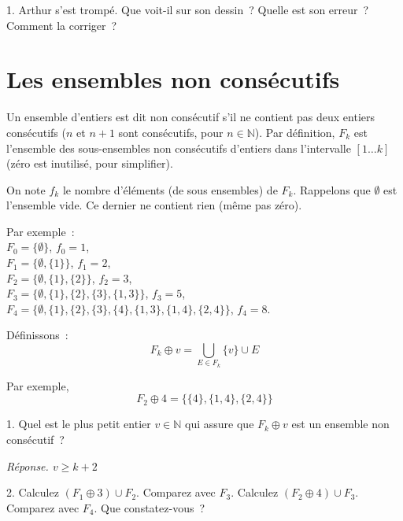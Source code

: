 \documentclass[11pt]{article}
\def\N{\mathbb N}
\newcommand{\comment}[1]{}
\begin{document}
1. Arthur s'est trompé. Que voit-il sur son dessin~?
Quelle est son erreur~?  Comment la corriger~?



\comment{
\begin{figure}
\begin{center}
\texttt{[image: 2000px-Sierpinski\_triangle.svg.eps]}
\end{center}
\caption{Un triangle équilatéral de Sierpinski.}
\end{figure}
}

{
\section{Les ensembles non consécutifs}
Un ensemble d'entiers est dit non consécutif s'il ne contient pas deux entiers consécutifs ($n$ et $n+1$ sont consécutifs, pour $n\in \N$). 
Par définition, $F_k$ est l'ensemble des sous-ensembles  non consécutifs d'entiers dans l'intervalle $[1 \ldots k]$ (zéro est inutilisé, pour simplifier). 

On note $f_k$ le nombre d'éléments (de sous ensembles) de $F_k$. Rappelons que $\emptyset$ est l'ensemble vide. Ce dernier ne contient rien (même pas zéro).

Par exemple~: \\
\indent $F_0=\{ \emptyset \}$,  $f_0=1 $, \\
\indent $F_1= \{ \emptyset, \{1\}\}$, $f_1= 2$,\\
\indent $F_2= \{ \emptyset, \{1\}, \{2\} \}$, $f_2=3$,\\
\indent $F_3= \{ \emptyset, \{1\}, \{2\}, \{3\}, \{1, 3\}\}$, $f_3=5 $,\\
\indent $F_4= \{ \emptyset, \{1\}, \{2\}, \{3\}, \{4\},  \{1, 3\}, \{1, 4\}, \{2, 4 \}\}$, $f_4=8$.

Définissons~:
$$F_k \oplus v= \bigcup_{E\in F_k} \{v\} \cup E$$ 

Par exemple, 
$$F_2 \oplus 4= \{ \{4\}, \{1,4\},  \{2, 4\}  \}$$

1. Quel est le plus petit entier $v\in \N$ qui assure que  $F_k \oplus v$ est un ensemble non consécutif~?

\ifcorrige

\medskip
{\it  Réponse.
$v \ge k+2$
}
\medskip

\else
\fi

2. Calculez $(F_1 \oplus 3) \cup F_2$.
Comparez avec $F_3$.
Calculez $(F_2 \oplus 4)  \cup F_3$.
Comparez avec $F_4$.
Que constatez-vous~?

}
\end{document}
